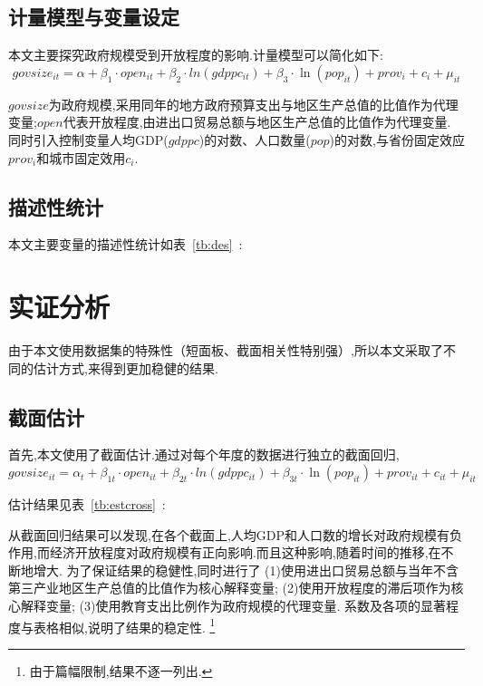 \documentclass[10pt]{article}
\begin{document}
\subsection{计量模型与变量设定}
本文主要探究政府规模受到开放程度的影响.计量模型可以简化如下:
\begin{equation}
 govsize_{it} = \alpha + \beta_1 \cdot open_{it} + \beta_2 \cdot ln(gdppc_{it}) + \beta_3 \cdot \ln(pop_{it}) + prov_{i} +c_i + \mu_{it}
 \end{equation}


$govsize$为政府规模,采用同年的地方政府预算支出与地区生产总值的比值作为代理变量;$open$代表开放程度,由进出口贸易总额与地区生产总值的比值作为代理变量.
同时引入控制变量人均GDP($gdppc$)的对数、人口数量($pop$)的对数,与省份固定效应$prov_i$和城市固定效用$c_i$.

\subsection{描述性统计}
本文主要变量的描述性统计如表~\ref{tb:des}~:


\section{实证分析}
    由于本文使用数据集的特殊性（短面板、截面相关性特别强）,所以本文采取了不同的估计方式,来得到更加稳健的结果.
\subsection{截面估计}
    首先,本文使用了截面估计.通过对每个年度的数据进行独立的截面回归,
    \begin{equation}
        govsize_{it} = \alpha_t + \beta_{1t} \cdot open_{it} + \beta_{2t} \cdot ln(gdppc_{it}) + \beta_{3t} \cdot \ln(pop_{it}) + prov_{it} +c_{it} + \mu_{it}
    \end{equation}


    估计结果见表~\ref{tb:estcross}~:

        从截面回归结果可以发现,在各个截面上,人均GDP和人口数的增长对政府规模有负作用,而经济开放程度对政府规模有正向影响.而且这种影响,随着时间的推移,在不断地增大.
        为了保证结果的稳健性,同时进行了
        (1)使用进出口贸易总额与当年不含第三产业地区生产总值的比值作为核心解释变量;
        (2)使用开放程度的滞后项作为核心解释变量;
        (3)使用教育支出比例作为政府规模的代理变量.
        系数及各项的显著程度与表格相似,说明了结果的稳定性.
    \footnote{由于篇幅限制,结果不逐一列出.}
\end{document}
